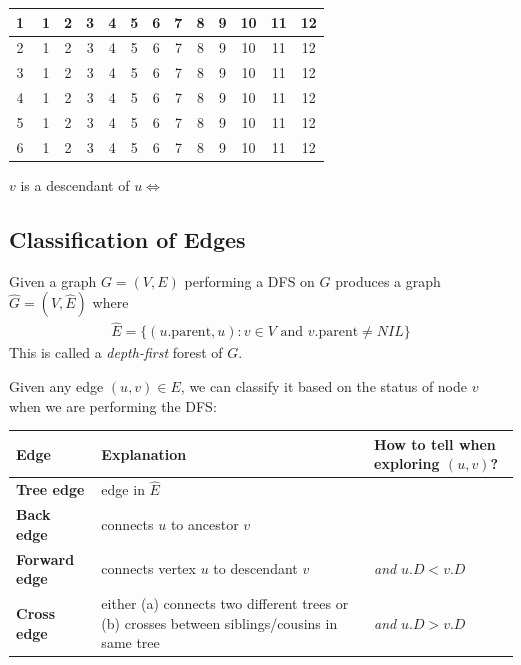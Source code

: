 \documentclass[11  pt]{exam}
\begin{document}
\vspace{1cm} 
	\begin{center}
		{\Huge
	\begin{tabular}{|c |  c c c c c c c c c c c c |}
		\hline
		\textcircled{1} & 1 & 2 & 3 & 4 & 5 & 6 & 7 & 8 & 9 & 10 & 11 & 12 \\ \hline
		\textcircled{2} & 1 & 2 & 3 & 4 & 5 & 6 & 7 & 8 & 9 & 10 & 11 & 12 \\ \hline
		\textcircled{3} & 1 & 2 & 3 & 4 & 5 & 6 & 7 & 8 & 9 & 10 & 11 & 12 \\ \hline
		\textcircled{4} & 1 & 2 & 3 & 4 & 5 & 6 & 7 & 8 & 9 & 10 & 11 & 12 \\ \hline
		\textcircled{5} & 1 & 2 & 3 & 4 & 5 & 6 & 7 & 8 & 9 & 10 & 11 & 12 \\ \hline
		\textcircled{6} & 1 & 2 & 3 & 4 & 5 & 6 & 7 & 8 & 9 & 10 & 11 & 12 \\ \hline
	\end{tabular}
}
\end{center}
\vs{1cm}

\begin{corollary}
	$v$ is a descendant of $u \iff $ 
\end{corollary}

	\newpage
	\subsection{Classification of Edges}
	
	Given a graph $G = (V,E)$ performing a DFS on $G$ produces a graph $\hat{G} = (V, \hat{E})$ where
	\begin{align*}
		\hat{E} = \{ (u.\text{parent}, u) \colon v \in V \text{ and } v.\text{parent} \neq NIL  \}
	\end{align*}
	This is called a \emph{depth-first} forest of $G$. \\
	
	\vspace{4cm}
	
	Given any edge $(u,v) \in E$, we can classify it based on the status of node $v$ when we are performing the DFS:\\
	
	
	\begin{tabular}{| l | p{8cm} | p{6cm} |}
		\hline
		Edge & Explanation & How to tell when exploring $(u,v)$? \\
		\hline
		\textbf{Tree edge}  & edge in $\hat{E}$ & %
		\\
		\hline
		\textbf{Back edge} & connects $u$ to ancestor $v$ & %
		\\
		\hline
		\textbf{Forward edge} & connects vertex $u$ to descendant $v$ & \phantom{spaceasdfasdf2xsdf} \emph{and} $u.D < v.D$\\
		\hline
		\textbf{Cross edge} & either (a) connects two different trees or (b) crosses between siblings/cousins in same tree &  \phantom{spaceasdfasdf2xsdf} \emph{and} $u.D > v.D$\\
		\hline
	\end{tabular}
	
\end{document}
